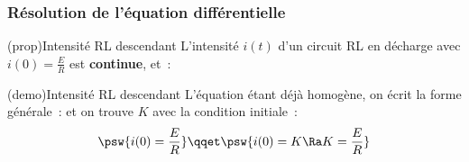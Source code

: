 \documentclass[../../main/main.tex]{subfiles}
\begin{document}
\subsubsection{Résolution de l'équation différentielle}
  \begin{tcb*}[label=prop:rlsoludech](prop){Intensité RL descendant}
    L'intensité $i(t)$ d'un circuit RL en décharge avec $i(0) = \frac{E}{R}$ est
    \textbf{continue}, et~:
		\psw{%
			\[\boxed{i(t) = \frac{E}{R}\exp\left(-\frac{t}{\tau}\right)}\]
		}%
	\end{tcb*}
	\begin{tcb*}[label=demo:rlsoludech](demo){Intensité RL descendant}
		L'équation étant déjà homogène, on écrit la forme générale~:
		\psw{%
			\[i(t) = K\exp\left( -\frac{t}{\tau} \right)\]
		}%
		et on trouve $K$ avec la condition initiale~:
		\[
			\psw{i(0) = \frac{E}{R}}
			\qqet
			\psw{i(0) = K \Ra K=\frac{E}{R}}
		\]
	\end{tcb*}
\end{document}
